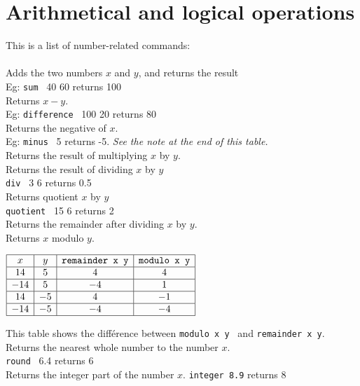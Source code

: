 \section{Arithmetical and logical operations}
This is a list of number-related commands:\\ \\
 Adds the two numbers $x$ and $y$, and returns the result\\
 Eg: \texttt{sum} \ 40 60 returns 100\\
 Returns $x-y$.\\
 Eg: \texttt{difference} \ 100 20 returns 80\\
 Returns the negative of $x$. \\
Eg: \texttt{minus} \ 5 returns -5. \emph{See the note at the end
of this table.}\\
 Returns the result of multiplying $x$ by $y$.\\
 Returns the result of dividing $x$ by $y$\\
 \texttt{div} \ 3 6 returns 0.5\\
Returns quotient $x$ by $y$\\
 \texttt{quotient} \ 15 6 returns 2\\
 Returns the remainder after dividing $x$ by $y$.\\
 Returns $x$ modulo $y$. 
\begin{center}
 $\begin{array}{|c|c|c|c|}
 \hline
x & y & \textrm{\texttt{remainder x y}} & \textrm{\texttt{modulo x y}} \\
\hline
14 & 5 & 4& 4\\
\hline
-14 & 5 &-4 & 1\\
\hline
14 & -5 & 4 & -1\\
\hline
-14 & -5 & -4 & -4 \\
\hline
\end{array}
$
\end{center}
This table shows the différence between \texttt{modulo x y } and \texttt{remainder x y}.\\
Returns the nearest whole number to the number $x$.\\
 \texttt{round} \ 6.4 returns 6\\
Returns the integer part of the number $x$.
 \texttt{integer 8.9} returns 8\\
